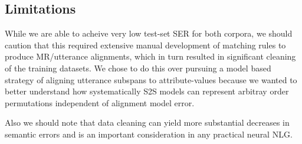 \subsection{Limitations}

While we are able to acheive very low test-set SER for both corpora, we 
should caution that this required extensive manual development of matching 
rules to produce MR/utterance alignments, which in turn resulted in 
significant cleaning of the training datasets. We chose to do this over 
pursuing a model based strategy of aligning utterance subspans to 
attribute-values %
because we wanted to better understand how systematically S2S models can
represent arbitray order permutations independent of alignment model error. 


Also we should note that 
data cleaning can yield more substantial decreases in
semantic errors \citep{dusek2019,hongminwang2019} and is an important 
consideration in any practical neural NLG.
